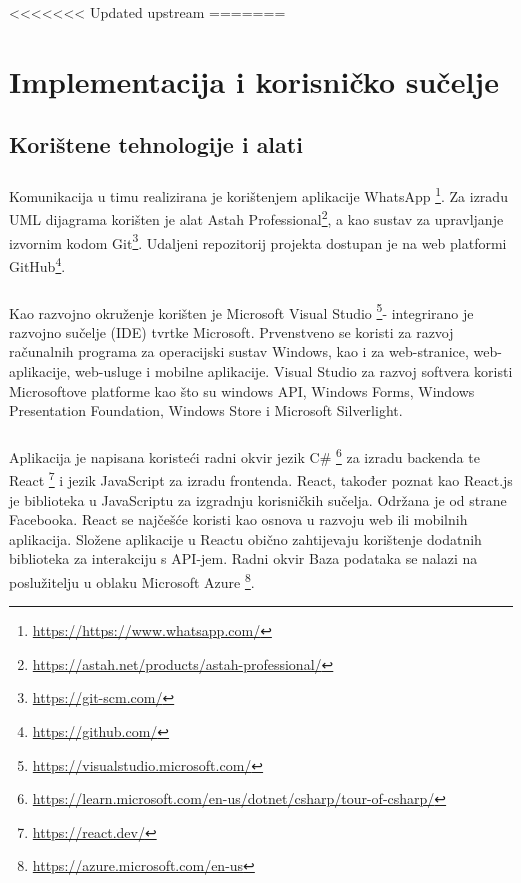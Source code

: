<<<<<<< Updated upstream
=======
\chapter{Implementacija i korisničko sučelje}

\section{Korištene tehnologije i alati}

\paragraph{}
{Komunikacija u timu realizirana je korištenjem aplikacije WhatsApp \footnote{\url{https://https://www.whatsapp.com/}}. Za izradu UML dijagrama korišten je alat Astah Professional\footnote{\url{https://astah.net/products/astah-professional/}}, a kao sustav za upravljanje izvornim kodom Git\footnote{\url{https://git-scm.com/}}. Udaljeni repozitorij projekta dostupan je na web platformi GitHub\footnote{\url{https://github.com/}}.
}
\paragraph{}{
Kao razvojno okruženje korišten je Microsoft Visual Studio \footnote{\url{https://visualstudio.microsoft.com/}}- integrirano je razvojno sučelje (IDE) tvrtke Microsoft. Prvenstveno se koristi za razvoj računalnih programa za operacijski sustav Windows, kao i za web-stranice, web-aplikacije, web-usluge i mobilne aplikacije. Visual Studio za razvoj softvera koristi Microsoftove platforme kao što su windows API, Windows Forms, Windows Presentation Foundation, Windows Store i Microsoft Silverlight.
}
\paragraph{}{
Aplikacija je napisana koristeći radni okvir jezik C\# \footnote{\url{https://learn.microsoft.com/en-us/dotnet/csharp/tour-of-csharp/}} za izradu backenda te React \footnote{\url{https://react.dev/}} i jezik JavaScript za izradu frontenda. React, također poznat kao React.js je biblioteka u JavaScriptu za izgradnju korisničkih sučelja. Održana je od strane Facebooka. React se najčešće koristi kao osnova u razvoju web ili mobilnih aplikacija. Složene aplikacije u Reactu obično zahtijevaju korištenje dodatnih biblioteka za interakciju s API-jem. Radni okvir Baza podataka se nalazi na poslužitelju u oblaku Microsoft Azure \footnote{\url{https://azure.microsoft.com/en-us}}.
}	



